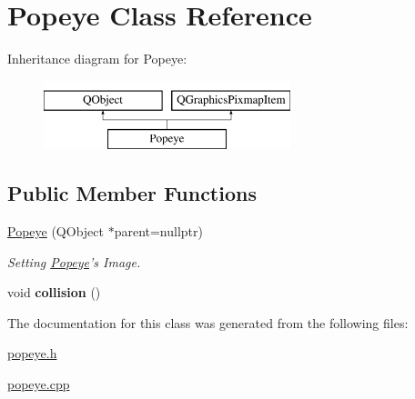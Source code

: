 \hypertarget{classPopeye}{\section{Popeye Class Reference}
\label{classPopeye}
}
Inheritance diagram for Popeye\-:\begin{figure}[H]
\begin{center}
\leavevmode
\includegraphics[height=2.000000cm]{classPopeye}
\end{center}
\end{figure}
\subsection*{Public Member Functions}
\begin{DoxyCompactItemize}
\item 
\hypertarget{classPopeye_ae4a4d6f5e847b9b316067130239c47f9}{\hyperlink{classPopeye_ae4a4d6f5e847b9b316067130239c47f9}{Popeye} (Q\-Object $\ast$parent=nullptr)}\label{classPopeye_ae4a4d6f5e847b9b316067130239c47f9}

\begin{DoxyCompactList}\small\item\em Setting \hyperlink{classPopeye}{Popeye}'s Image. \end{DoxyCompactList}\item 
\hypertarget{classPopeye_a9d6721f8f275b6eb1747408fa292cd71}{void {\bfseries collision} ()}\label{classPopeye_a9d6721f8f275b6eb1747408fa292cd71}

\end{DoxyCompactItemize}


The documentation for this class was generated from the following files\-:\begin{DoxyCompactItemize}
\item 
\hyperlink{popeye_8h}{popeye.\-h}\item 
\hyperlink{popeye_8cpp}{popeye.\-cpp}\end{DoxyCompactItemize}
